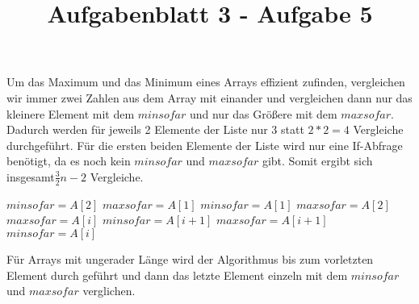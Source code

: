 \documentclass{article}
\title{Aufgabenblatt 3 - Aufgabe 5}
\begin{document}
\maketitle
Um das Maximum und das Minimum eines Arrays effizient zufinden, vergleichen wir immer zwei Zahlen aus dem Array mit einander und vergleichen dann nur das kleinere Element mit dem $minsofar$ und nur das Gr\"o{\ss}ere mit dem $maxsofar$. Dadurch werden f\"ur jeweils 2 Elemente der Liste nur 3 statt $2*2=4$ Vergleiche durchgef\"uhrt. F\"ur die ersten beiden Elemente der Liste wird nur eine If-Abfrage ben\"otigt, da es noch kein $minsofar$ und $maxsofar$ gibt. Somit ergibt sich insgesamt$\frac{3}{2}n-2$ Vergleiche.
\begin{algorithmic}
		\State $minsofar=A[2]$
		\State $maxsofar=A[1]$
	\Else
		\State $minsofar=A[1]$
		\State $maxsofar=A[2]$
	\EndIf
				\State $maxsofar=A[i]$
			\EndIf
				\State $minsofar=A[i+1]$
			\EndIf
		\Else
				\State $maxsofar=A[i+1]$
			\EndIf
				\State $minsofar=A[i]$
			\EndIf
		\EndIf
	\EndFor
\EndFunction
\end{algorithmic}
F\"ur Arrays mit ungerader L\"ange wird der Algorithmus bis zum vorletzten Element durch gef\"uhrt und dann das letzte Element einzeln mit dem $minsofar$ und $maxsofar$ verglichen.
\end{document}
